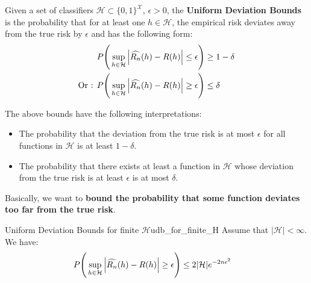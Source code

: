 \begin{definition}
    Given a set of classifiers $\mathcal{H} \subset \{0,1\}^{\mathcal{X}}$, $\epsilon > 0$, the \textbf{Uniform Deviation Bounds} is the probability that for at least one $h\in\mathcal{H}$, the empirical risk deviates away from the true risk by $\epsilon$ and has the following form:
    \begin{align*}
        P\Bigg( 
            \sup_{h\in\mathcal{H}}\Big| \widehat{R_n}(h) - R(h) \Big| \le \epsilon
         \Bigg) &\ge 1 - \delta \\
        \text{Or : }
        P\Bigg( 
            \sup_{h\in\mathcal{H}}\Big| \widehat{R_n}(h) - R(h) \Big| \ge \epsilon
         \Bigg) &\le \delta
    \end{align*}

    \noindent The above bounds have the following interpretations:
    \begin{itemize}
        \item The probability that the deviation from the true risk is at most $\epsilon$ for all functions in $\mathcal{H}$ is at least $1-\delta$.
        \item The probability that there exists at least a function in $\mathcal{H}$ whose deviation from the true risk is at least $\epsilon$ is at most $\delta$.
    \end{itemize}

    \noindent Basically, we want to \textbf{bound the probability that some function deviates too far from the true risk}.
\end{definition}

\begin{proposition}{Uniform Deviation Bounds for finite $\mathcal{H}$}{udb_for_finite_H}
    Assume that $|\mathcal{H}| < \infty$. We have:
    \begin{align*}
        P\Bigg( 
            \sup_{h\in\mathcal{H}}\Big| \widehat{R_n}(h) - R(h) \Big| \ge \epsilon
         \Bigg) &\le 2|\mathcal{H}|e^{-2n\epsilon^2}
    \end{align*}
\end{proposition}

